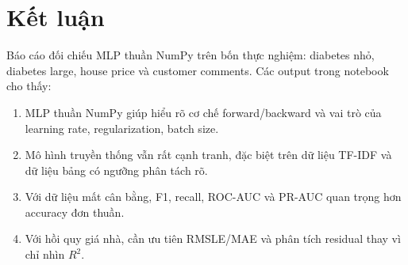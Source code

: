 \documentclass[12pt,a4paper]{report}
\begin{document}
\section{Kết luận}
Báo cáo đối chiếu MLP thuần NumPy trên bốn thực nghiệm: diabetes nhỏ, diabetes large, house price và customer comments. Các output trong notebook cho thấy:
\begin{enumerate}
    \item MLP thuần NumPy giúp hiểu rõ cơ chế forward/backward và vai trò của learning rate, regularization, batch size.
    \item Mô hình truyền thống vẫn rất cạnh tranh, đặc biệt trên dữ liệu TF-IDF và dữ liệu bảng có ngưỡng phân tách rõ.
    \item Với dữ liệu mất cân bằng, F1, recall, ROC-AUC và PR-AUC quan trọng hơn accuracy đơn thuần.
    \item Với hồi quy giá nhà, cần ưu tiên RMSLE/MAE và phân tích residual thay vì chỉ nhìn $R^2$.
\end{enumerate}
\end{document}
